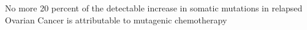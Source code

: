 No more 20 percent of the detectable increase in somatic mutations in relapsed Ovarian Cancer is attributable to mutagenic chemotherapy
